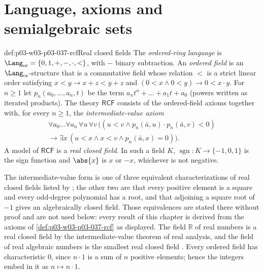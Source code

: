 \section{Language, axioms and semialgebraic sets}
\label{sec:p03-w03-p03-037-axioms}

\begin{hbdefinition}{def:p03-w03-p03-037-rcf}{Real closed fields}
The \emph{ordered-ring language} is
\(\Lang_{\mathrm{or}}=\{0,1,+,-,\mathbin{\cdot},<\}\), with \(-\) binary
subtraction.  An \emph{ordered field} is an \(\Lang_{\mathrm{or}}\)-structure
that is a commutative field whose relation \(<\) is a strict linear order
satisfying \(x<y\rightarrow x+z<y+z\) and
\((0<x\wedge 0<y)\rightarrow 0<x\mathbin{\cdot}y\).
For \(n\geq 1\) let \(p_n(a_0,\dots,a_n,t)\) be the term
\(a_n t^n+\dots+a_1t+a_0\) (powers written as iterated products).  The
theory \(\mathsf{RCF}\) consists of the ordered-field axioms together with,
for every \(n\geq1\), the \emph{intermediate-value axiom}
\begin{multline*}
\forall a_0\dots\forall a_n\,\forall u\,\forall v\,
\bigl((u<v\wedge p_n(\bar a,u)\mathbin{\cdot}p_n(\bar a,v)<0)\\ \rightarrow\exists x\,(u<x\wedge x<v\wedge p_n(\bar a,x)=0)\bigr).
\end{multline*}
A model of \(\mathsf{RCF}\) is a \emph{real closed field}.  In such a field
\(K\), \(\operatorname{sgn}:K\to\{-1,0,1\}\) is the sign function and
\(\abs{x}\) is \(x\) or \(-x\), whichever is not negative.
\end{hbdefinition}

The intermediate-value form is one of three equivalent characterizations of
real closed fields listed by \cite[p.~8]{Coste1999OMin}; the other two are
that every positive element is a square and every odd-degree polynomial has
a root, and that adjoining a square root of \(-1\) gives an algebraically
closed field.  Those equivalences are stated there without proof and are not
used below: every result of this chapter is derived from the axioms of
\cref{def:p03-w03-p03-037-rcf} as displayed.  The field \(\mathbb R\) of real
numbers is a real closed field by the intermediate-value theorem of real
analysis, and the field of real algebraic numbers is the smallest real closed
field \cite[p.~9]{Coste1999OMin}.  Every ordered field has
characteristic \(0\), since \(n\cdot1\) is a sum of \(n\) positive elements;
hence the integers embed in it as \(n\mapsto n\cdot 1\).

